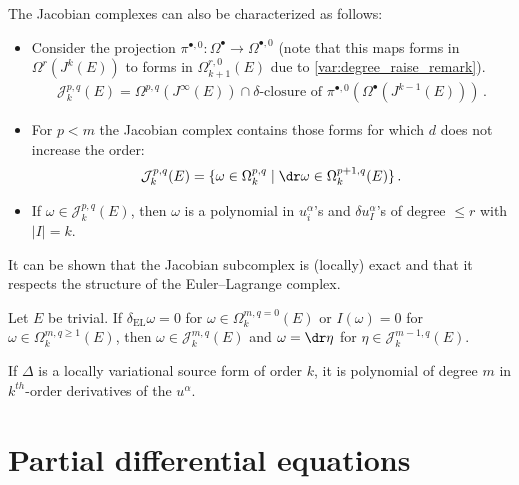     \begin{property}
        The Jacobian complexes can also be characterized as follows:
        \begin{itemize}
            \item Consider the projection $\pi^{\bullet,0}:\Omega^\bullet\rightarrow\Omega^{\bullet,0}$ (note that this maps forms in $\Omega^r(J^k(E))$ to forms in $\Omega^{r,0}_{k+1}(E)$ due to \cref{var:degree_raise_remark}).
            \begin{gather}
                \mathcal{J}^{p,q}_k(E) = \Omega^{p,q}(J^\infty(E))\cap\delta\text{-closure of }\pi^{\bullet,0}\left(\Omega^\bullet(J^{k-1}(E))\right)\,.
            \end{gather}
            \item For $p<m$ the Jacobian complex contains those forms for which $d$ does not increase the order:
            \begin{gather}
                \mathcal{J}^{p,q}_k(E) = \{\omega\in\Omega^{p,q}_k\mid\dr\omega\in\Omega^{p+1,q}_k(E)\}\,.
            \end{gather}
            \item If $\omega\in\mathcal{J}^{p,q}_k(E)$, then $\omega$ is a polynomial in $u^\alpha_i$'s and $\delta u^\alpha_I$'s of degree $\leq r$ with $|I|=k$.
        \end{itemize}
    \end{property}

    It can be shown that the Jacobian subcomplex is (locally) exact and that it respects the structure of the Euler--Lagrange complex.
    \begin{property}[Exactness]
        Let $E$ be trivial. If $\delta_{\text{EL}}\omega=0$ for $\omega\in\Omega^{m,q=0}_k(E)$ or $I(\omega)=0$ for $\omega\in\Omega^{m,q\geq1}_k(E)$, then $\omega\in\mathcal{J}^{m,q}_k(E)$ and $\omega=\dr\eta$ for $\eta\in\mathcal{J}^{m-1,q}_k(E)$.
    \end{property}

    \begin{property}
        If $\Delta$ is a locally variational source form of order $k$, it is polynomial of degree $m$ in $k^{th}$-order derivatives of the $u^\alpha$.
    \end{property}

\section{Partial differential equations}

